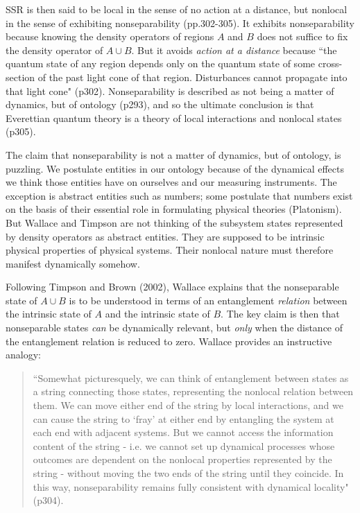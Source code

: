 \documentclass[a4paper]{article}
\begin{document}
SSR is then said to be local in the sense of no action at a distance, but nonlocal in the sense of exhibiting nonseparability (pp.302-305). It exhibits nonseparability because knowing the density operators of regions $A$ and $B$ does not suffice to fix the density operator of $A\cup B$. But it avoids \textit{action at a distance} because ``the quantum state of any region depends only on the quantum state of some cross-section of the past light cone of that region. Disturbances cannot propagate into that light cone" (p302). Nonseparability is described as not being a matter of dynamics, but of ontology (p293), and so the ultimate conclusion is that Everettian quantum theory is a theory of local interactions and nonlocal states (p305).

The claim that nonseparability is not a matter of dynamics, but of ontology, is puzzling. We postulate entities in our ontology because of the dynamical effects we think those entities have on ourselves and our measuring instruments. The exception is abstract entities such as numbers; some postulate that numbers exist on the basis of their essential role in formulating physical theories (Platonism). But Wallace and Timpson are not thinking of the subsystem states represented by density operators as abstract entities. They are supposed to be intrinsic physical properties of physical systems. Their nonlocal nature must therefore manifest dynamically somehow.

Following Timpson and Brown (2002), Wallace explains that the nonseparable state of $A\cup B$ is to be understood in terms of an entanglement \textit{relation} between the intrinsic state of $A$ and the intrinsic state of $B$. The key claim is then that nonseparable states \textit{can} be dynamically relevant, but \textit{only} when the distance of the entanglement relation is reduced to zero. Wallace provides an instructive analogy:

\begin{quote}
    ``Somewhat picturesquely, we can think of entanglement between states as a string connecting those states, representing the nonlocal relation between them. We can move either end of the string by local interactions, and we can cause the string to `fray' at either end by entangling the system at each end with adjacent systems. But we cannot access the information content of the string - i.e. we cannot set up dynamical processes whose outcomes are dependent on the nonlocal properties represented by the string - without moving the two ends of the string until they coincide. In this way, nonseparability remains fully consistent with dynamical locality" (p304).
    \end{quote}
\end{document}
